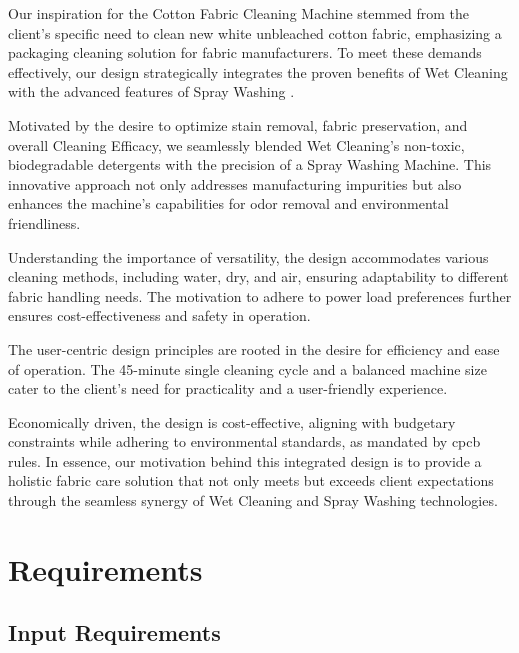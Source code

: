 \documentclass[12pt]{article} %
\begin{document}
Our inspiration for the Cotton Fabric Cleaning Machine stemmed from the client's specific need to clean new white unbleached cotton fabric, emphasizing a packaging cleaning solution for fabric manufacturers. To meet these demands effectively, our design strategically integrates the proven benefits of Wet Cleaning with the advanced features of Spray Washing \cite{liu2019research}.
\vspace{10pt}

Motivated by the desire to optimize stain removal, fabric preservation, and overall \gls{Cleaning Efficacy}, we seamlessly blended Wet Cleaning's non-toxic, biodegradable detergents with the precision of a Spray Washing Machine. This innovative approach not only addresses manufacturing impurities but also enhances the machine's capabilities for odor removal and environmental friendliness.
\vspace{10pt}


Understanding the importance of versatility, the design accommodates various cleaning methods, including water, dry, and air, ensuring adaptability to different fabric handling needs. The motivation to adhere to power load preferences further ensures cost-effectiveness and safety in operation.
\vspace{10pt}


The user-centric design principles are rooted in the desire for efficiency and ease of operation. The 45-minute single cleaning cycle and a balanced machine size cater to the client's need for practicality and a user-friendly experience.
\vspace{10pt}


Economically driven, the design is cost-effective, aligning with budgetary constraints while adhering to environmental standards, as mandated by \acrshort{cpcb} rules. In essence, our motivation behind this integrated design is to provide a holistic fabric care solution that not only meets but exceeds client expectations through the seamless synergy of Wet Cleaning and Spray Washing technologies.




\newpage

\section{Requirements}
\subsection{Input Requirements}
\end{document}
